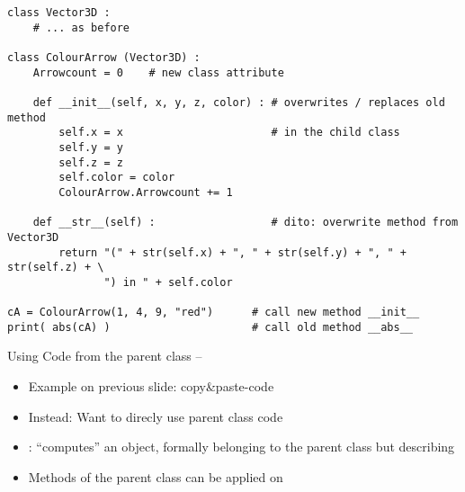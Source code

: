 \begin{frame}[fragile]
%
\begin{codebox}
\begin{verbatim}
class Vector3D :
    # ... as before

class ColourArrow (Vector3D) :
    Arrowcount = 0    # new class attribute
    
    def __init__(self, x, y, z, color) : # overwrites / replaces old method
        self.x = x                       # in the child class
        self.y = y
        self.z = z
        self.color = color
        ColourArrow.Arrowcount += 1
    
    def __str__(self) :                  # dito: overwrite method from Vector3D
        return "(" + str(self.x) + ", " + str(self.y) + ", " + str(self.z) + \
               ") in " + self.color

cA = ColourArrow(1, 4, 9, "red")      # call new method __init__
print( abs(cA) )                      # call old method __abs__
\end{verbatim}
\end{codebox}
%
\end{frame}


\begin{frame}[fragile]{Using Code from the parent class -- }
%
\begin{itemize}
\item Example on previous slide: copy\&paste-code
\item Instead: Want to direcly use parent class code
\item {}: \enquote{computes} an object, formally belonging to the parent class but describing 
\item[\Thus] Methods of the parent class can be applied on  \inPy{self}
\end{itemize}
%
\end{frame}


